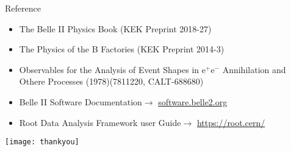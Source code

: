 \documentclass[12pt]{beamer}
\begin{document}
%
%
	


\appendix
\begin{frame}{Reference}
	\begin{scriptsize}
		\begin{itemize}
			\item The Belle II Physics Book (KEK Preprint 2018-27)
			\item The Physics of the B Factories (KEK Preprint 2014-3)
			\item Observables for the Analysis of Event Shapes in e$^{+}$e$^{-}$ Annihilation and Othere Processes (1978)(7811220, CALT-688680)
			\item Belle II Software Documentation$\rightarrow$ \href{http://software.belle2.org}{software.belle2.org}
			\item Root Data Analysis Framework user Guide$\rightarrow$ \href{https://root.cern/}{https://root.cern/}
		\end{itemize}
	\end{scriptsize}
\end{frame}

\begin{frame}{}                                                                           
	\texttt{[image: thankyou]}
\end{frame}


\begin{frame}{}                                                                           

\end{frame}
\begin{frame}{}                                                                           
\end{frame}
\end{document}
